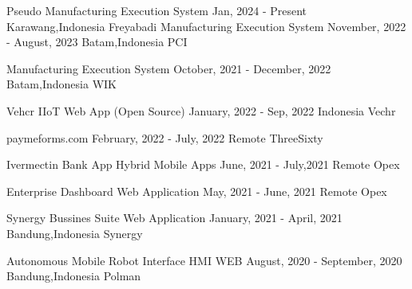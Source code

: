 
\begin{cvhonors}
  \cvhonor
    {Pseudo Manufacturing Execution System} %
    {Jan, 2024 - Present} %
    {Karawang,Indonesia} %
    {Freyabadi} %
  \cvhonor
    {Manufacturing Execution System} %
    {November, 2022 - August, 2023} %
    {Batam,Indonesia} %
    {PCI} %

  \cvhonor
    {Manufacturing Execution System} %
    {October, 2021 - December, 2022} %
    {Batam,Indonesia} %
    {WIK} %

  \cvhonor
    {Vehcr IIoT Web App (Open Source)} %
    {January, 2022 - Sep, 2022} %
    {Indonesia} %
    {Vechr} %

  \cvhonor
    {paymeforms.com} %
    {February, 2022 - July, 2022} %
    {Remote} %
    {ThreeSixty} %

  \cvhonor
    {Ivermectin Bank App Hybrid Mobile Apps} %
    {June, 2021 - July,2021} %
    {Remote} %
    {Opex} %

  \cvhonor
    {Enterprise Dashboard Web Application} %
    {May, 2021 - June, 2021} %
    {Remote} %
    {Opex} %
    
  \cvhonor
    {Synergy Bussines Suite Web Application} %
    {January, 2021 - April, 2021} %
    {Bandung,Indonesia} %
    {Synergy} %

  \cvhonor
    {Autonomous Mobile Robot Interface HMI WEB} %
    {August, 2020 - September, 2020} %
    {Bandung,Indonesia} %
    {Polman} %


\end{cvhonors}
